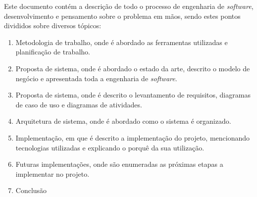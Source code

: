 Este documento contém a descrição de todo o processo de engenharia de \textit{software}, desenvolvimento e 
pensamento sobre o problema em mãos, sendo estes pontos divididos sobre diversos tópicos:
\begin{enumerate}
    \item Metodologia de trabalho, onde é abordado as ferramentas utilizadas e planificação de trabalho.
    \item Proposta de sistema, onde é abordado o estado da arte, descrito o modelo de negócio e apresentada 
    toda a engenharia de \textit{software}.
    \item Proposta de sistema, onde é descrito o levantamento de requisitos, diagramas 
    de caso de uso e diagramas de atividades.
    \item Arquitetura de sistema, onde é abordado como o sistema é organizado.
    \item Implementação, em que é descrito a implementação do projeto, mencionando tecnologias utilizadas e 
    explicando o porquê da sua utilização.
    \item Futuras implementações, onde são enumeradas as próximas etapas a implementar no projeto.
    \item Conclusão
\end{enumerate}


